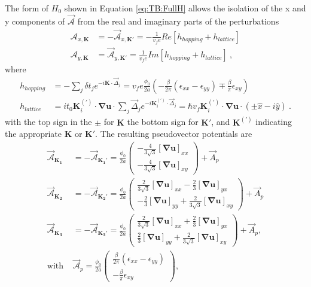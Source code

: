 The form of $H_0$ shown in Equation \ref{eq:TB:FullH} allows the isolation of the x and y components of $\vec{\mathcal{A}}$ from the real and imaginary parts of the perturbations
\begin{align}
  \mathcal{A}_{x,\bm{K}}&=-\vec{\mathcal{A}}_{x,\bm{K'}}=-\frac{1}{v_f e} Re[h_{hopping}+h_{lattice}] \nonumber \\
  \mathcal{A}_{y,\bm{K}}&=\vec{\mathcal{A}}_{y,\bm{K'}}= \frac{1}{v_f e} Im[h_{hopping}+h_{lattice}] \label{eq:PVP:AfromH}\ ,
\end{align}
where 
\begin{align}
  h_{hopping}&=-\sum_{j} \delta t_j e^{-i \bm{K} \cdot \vec{\Delta}_j}=
    v_f e \frac{\phi_0}{2a} \left(- \frac{\beta}{2 \pi} (\epsilon_{xx}-\epsilon_{yy})
    \mp \frac{\beta}{\pi} \epsilon_{xy} \right) \nonumber \\
  h_{lattice}&=i t_0  \bm{K}_i^{(')} \cdot \bm{\nabla u} \cdot \sum_{j} \vec{\Delta}_j e^{-i \bm{K}_i^{(')} \cdot \vec{\Delta}_j}
    =\hbar v_f \bm{K}_i^{(')}\cdot \bm{\nabla u} \cdot \left( \pm \hat{x}-i \hat{y}\right)  \label{eq:PVP:nocurl} \ .
\end{align}
with the top sign in the $\pm$ for $\bm{K}$ the bottom sign for $\bm{K'}$, and $\bm{K}^{(')}$ indicating the appropriate $\bm{K}$ or $\bm{K'}$.
The resulting pseudovector potentials are
\begin{align}
  \vec{\mathcal{A}}_{\bm{K_1}}&=-\vec{\mathcal{A}}_{\bm{K_1'}}=
    \frac{\phi_0}{2a} \left( \begin{array}{c} 
      -\frac{4}{3\sqrt{3}} [\bm{\nabla u}]_{xx} \\ 
      -\frac{4}{3\sqrt{3}} [\bm{\nabla u}]_{xy}
    \end{array} \right) +\vec{A}_p \nonumber \\ 
  \vec{\mathcal{A}}_{\bm{K_2}}&=-\vec{\mathcal{A}}_{\bm{K_2'}}=
    \frac{\phi_0}{2a} \left( \begin{array}{c} 
      \frac{2}{3\sqrt{3}}[\bm{\nabla u}]_{xx}-\frac{2}{3} [\bm{\nabla u}]_{yx} \\
      -\frac{2}{3} [\bm{\nabla u}]_{yy}+\frac{2}{3 \sqrt{3}} [\bm{\nabla u}]_{xy}
    \end{array} \right)+\vec{A}_p  \nonumber \\
  \vec{\mathcal{A}}_{\bm{K_3}}&=-\vec{\mathcal{A}}_{\bm{K_3'}}=
    \frac{\phi_0}{2a} \left( \begin{array}{c}
      \frac{2}{3\sqrt{3}}[\bm{\nabla u}]_{xx}+\frac{2}{3} [\bm{\nabla u}]_{yx} \\
      \frac{2}{3} [\bm{\nabla u}]_{yy}+\frac{2}{3 \sqrt{3}} [\bm{\nabla u}]_{xy}
    \end{array} \right)+\vec{A}_p  , \nonumber \\
  \textrm{with }
  &\vec{\mathcal{A}}_p= 
    \frac{\phi_0}{2a} \left( \begin{array}{c} 
      \frac{\beta }{2 \pi} (\epsilon_{xx}-\epsilon_{yy}) \\
      -\frac{\beta}{\pi} \epsilon_{xy}
    \end{array} \right),
  \label{eq:PVP:PVP}
\end{align}
